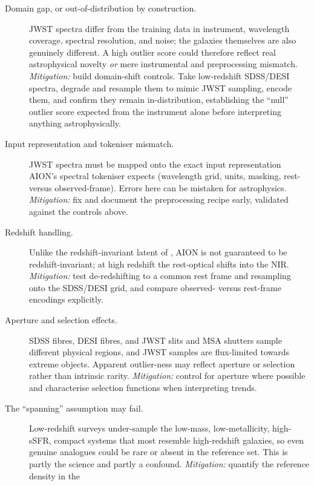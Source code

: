 \documentclass[onecolumn,astrosymb,tighten,longbib,trackchanges]{aastex7} %
\newcommand{\aion}{\textsc{AION}\xspace}
\begin{document}
\begin{description}
  \item[Domain gap, or out-of-distribution by construction.] JWST spectra differ from the training
        data in instrument, wavelength coverage, spectral resolution, and noise; the galaxies
        themselves are also genuinely different. A high outlier score could therefore reflect real
        astrophysical novelty \emph{or} mere instrumental and preprocessing mismatch.
        \textit{Mitigation:} build domain-shift controls. Take low-redshift SDSS/DESI spectra,
        degrade and resample them to mimic JWST sampling, encode them, and confirm they remain
        in-distribution, establishing the ``null'' outlier score expected from the instrument alone
        before interpreting anything astrophysically.
  \item[Input representation and tokeniser mismatch.] JWST spectra must be mapped onto the exact
        input representation \aion's spectral tokeniser expects (wavelength grid, units, masking,
        rest- versus observed-frame). Errors here can be mistaken for astrophysics.
        \textit{Mitigation:} fix and document the preprocessing recipe early, validated against the
        controls above.
  \item[Redshift handling.] Unlike the redshift-invariant latent of
        \citet{Liang2023_outlier_detection}, \aion is not guaranteed to be redshift-invariant; at
        high redshift the rest-optical shifts into the NIR. \textit{Mitigation:} test de-redshifting
        to a common rest frame and resampling onto the SDSS/DESI grid, and compare observed- versus
        rest-frame encodings explicitly.
  \item[Aperture and selection effects.] SDSS fibres, DESI fibres, and JWST slits and MSA shutters
        sample different physical regions, and JWST samples are flux-limited towards extreme objects.
        Apparent outlier-ness may reflect aperture or selection rather than intrinsic rarity.
        \textit{Mitigation:} control for aperture where possible and characterise selection
        functions when interpreting trends.
  \item[The ``spanning'' assumption may fail.] Low-redshift surveys under-sample the low-mass,
        low-metallicity, high-sSFR, compact systems that most resemble high-redshift galaxies, so
        even genuine analogues could be rare or absent in the reference set. This is partly the
        science and partly a confound. \textit{Mitigation:} quantify the reference density in the

\end{description}
\end{document}
